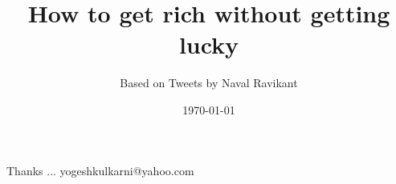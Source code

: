 \documentclass[xcolor=dvipsnames,compress,t,pdf]{beamer}
\title[\hspace{4cm} \insertframenumber /\inserttotalframenumber]
{How to get rich without getting lucky}
\subtitle[]{Based on Tweets by Naval Ravikant}
\date[2020]{\today}
\begin{document}
\begin{frame}
\titlepage
\end{frame}




\begin{frame}[c]{}
Thanks ...
\vspace{5mm}
yogeshkulkarni@yahoo.com
\end{frame}
\end{document}
